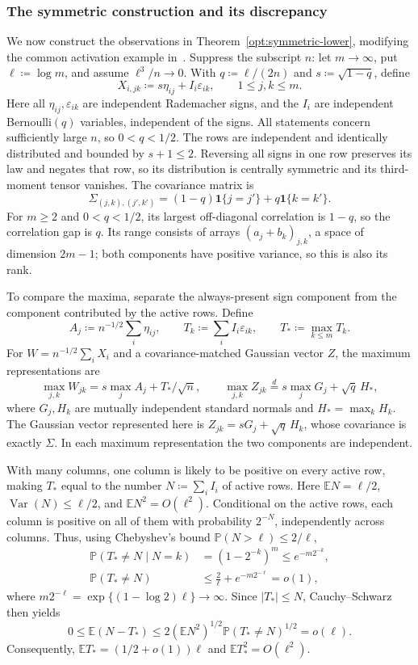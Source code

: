 \documentclass[11pt,letterpaper]{article}
\theoremstyle{remark}
\newcommand{\E}{\mathbb E}
\newcommand{\Pp}{\mathbb P}
\newcommand{\ind}{\mathbf 1}
\begin{document}
\subsubsection{The symmetric construction and its discrepancy}

We now construct the observations in Theorem~\ref{opt:symmetric-lower},
modifying the common activation example in~\cite[Proposition~E.1]{FKLZ}.
Suppress the subscript \(n\): let \(m\to\infty\), put
\(\ell\coloneqq\log m\), and assume \(\ell^3/n\to0\).
With \(q\coloneqq\ell/(2n)\) and \(s\coloneqq\sqrt{1-q}\), define
\[
 X_{i,jk}\coloneqq s\eta_{ij}+I_i\varepsilon_{ik},\qquad 1\le j,k\le m.
\]
Here all \(\eta_{ij},\varepsilon_{ik}\) are independent Rademacher
signs, and the \(I_i\) are independent Bernoulli\((q)\) variables,
independent of the signs. All statements concern sufficiently large
\(n\), so \(0<q<1/2\).
The rows are independent and identically distributed and bounded by
\(s+1\le2\). Reversing all signs in one row preserves its law and
negates that row, so its distribution is centrally symmetric and
its third-moment tensor vanishes. The covariance matrix is
\[
 \Sigma_{(j,k),(j',k')}=(1-q)\ind\{j=j'\}+q\ind\{k=k'\}.
\]
For \(m\ge2\) and \(0<q<1/2\), its largest off-diagonal correlation
is \(1-q\), so the correlation gap is \(q\).
Its range consists of arrays \((a_j+b_k)_{j,k}\), a space of
dimension \(2m-1\); both components have positive variance, so this
is also its rank.

To compare the maxima, separate the always-present sign component
from the component contributed by the active rows. Define
\[
 A_j\coloneqq n^{-1/2}\sum_i\eta_{ij},\qquad
 T_k\coloneqq\sum_i I_i\varepsilon_{ik},\qquad
 T_*\coloneqq\max_{k\le m}T_k.
\]
For \(W=n^{-1/2}\sum_iX_i\) and a covariance-matched Gaussian
vector \(Z\), the maximum representations are
\[
 \max_{j,k}W_{jk}=s\max_jA_j+T_*/\sqrt n,\qquad
 \max_{j,k}Z_{jk}\stackrel d=s\max_jG_j+\sqrt q\,H_*,
\]
where \(G_j,H_k\) are mutually independent standard normals and
\(H_*=\max_kH_k\). The Gaussian vector represented here is
\(Z_{jk}=sG_j+\sqrt q\,H_k\), whose covariance is exactly \(\Sigma\).
In each maximum representation the two components are independent.

With many columns, one column is likely to be positive on every
active row, making \(T_*\) equal to the number \(N\coloneqq\sum_iI_i\)
of active rows. Here \(\E N=\ell/2\), \(\operatorname{Var}(N)\le\ell/2\),
and \(\E N^2=O(\ell^2)\). Conditional on the active rows, each
column is positive on all of them with probability \(2^{-N}\),
independently across columns. Thus, using Chebyshev's bound
\(\Pp(N>\ell)\le2/\ell\),
\begin{align*}
 \Pp(T_*\ne N\mid N=k)&=(1-2^{-k})^m\le e^{-m2^{-k}},\\
 \Pp(T_*\ne N)&\le\frac2\ell+e^{-m2^{-\ell}}=o(1),
\end{align*}
where \(m2^{-\ell}=\exp\{(1-\log2)\ell\}\to\infty\).
Since \(|T_*|\le N\),
Cauchy--Schwarz then yields
\[
 0\le\E(N-T_*)\le2(\E N^2)^{1/2}
                         \Pp(T_*\ne N)^{1/2}=o(\ell).
\]
Consequently, \(\E T_*=(1/2+o(1))\ell\) and
\(\E T_*^2=O(\ell^2)\).
\end{document}
